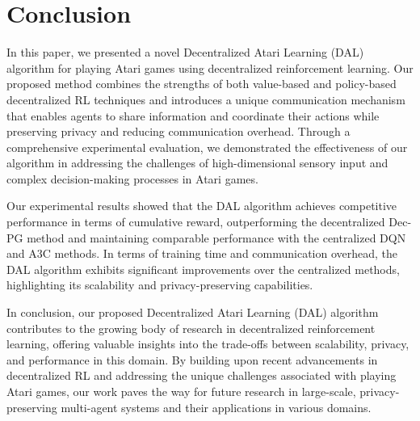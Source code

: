 \section{Conclusion}

In this paper, we presented a novel Decentralized Atari Learning (DAL) algorithm for playing Atari games using decentralized reinforcement learning. Our proposed method combines the strengths of both value-based and policy-based decentralized RL techniques and introduces a unique communication mechanism that enables agents to share information and coordinate their actions while preserving privacy and reducing communication overhead. Through a comprehensive experimental evaluation, we demonstrated the effectiveness of our algorithm in addressing the challenges of high-dimensional sensory input and complex decision-making processes in Atari games.

Our experimental results showed that the DAL algorithm achieves competitive performance in terms of cumulative reward, outperforming the decentralized Dec-PG method and maintaining comparable performance with the centralized DQN and A3C methods. In terms of training time and communication overhead, the DAL algorithm exhibits significant improvements over the centralized methods, highlighting its scalability and privacy-preserving capabilities.

In conclusion, our proposed Decentralized Atari Learning (DAL) algorithm contributes to the growing body of research in decentralized reinforcement learning, offering valuable insights into the trade-offs between scalability, privacy, and performance in this domain. By building upon recent advancements in decentralized RL and addressing the unique challenges associated with playing Atari games, our work paves the way for future research in large-scale, privacy-preserving multi-agent systems and their applications in various domains.